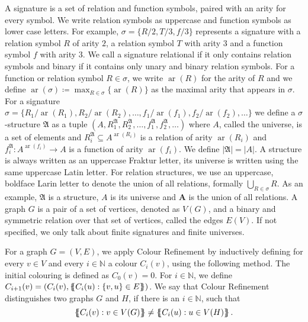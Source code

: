 A signature is a set of relation and function symbols, paired with an arity for every symbol.
We write relation symbols as uppercase and function symbols as lower case letters.
For example, $\sigma=\{R/2, T/3, f/3\}$ represents a signature with a relation symbol $R$ of arity $2$, a relation symbol $T$ with arity $3$ and a function symbol $f$ with arity $3$.
We call a signature relational if it only contains relation symbols and binary if it contains only unary and binary relation symbols.
For a function or relation symbol $R\in \sigma$, we write $\operatorname{ar}(R)$ for the arity of $R$ and we define $\operatorname{ar}(\sigma)\coloneqq \max_{R\in\sigma}\{\operatorname{ar}(R)\}$ as the maximal arity that appears in $\sigma$.
For a signature $\sigma=\{R_1/\operatorname{ar}(R_1), R_2/\operatorname{ar}(R_2), \dots, f_1/\operatorname{ar}(f_1),f_2/\operatorname{ar}(f_2),\dots\}$ we define a $\sigma$-structure $\mathfrak A$ as a tuple $(A,R_1^{\mathfrak A},R_2^{\mathfrak A},\dots,f_1^{\mathfrak A},f_2^{\mathfrak A},\dots)$ where $A$, called the universe, is a set of elements and $R_i^{\mathfrak A}\subseteq A^{\operatorname{ar}(R_i)}$ is a relation of arity $\operatorname{ar}(R_i)$ and $f_i^{\mathfrak A}:A^{\operatorname{ar}(f_i)}\to A$ is a function of arity $\operatorname{ar}(f_i)$.
We define $\vert \mathfrak A\vert =\vert A \vert$.
A structure is always written as an uppercase Fraktur letter, its universe is written using the same uppercase Latin letter.
For relation structures, we use an uppercase, boldface Larin letter to denote the union of all relations, formally $\bigcup_{R\in\sigma}R$.
As an example, $\mathfrak A$ is a structure, $A$ is its universe and $\mathbf A$ is the union of all relations.
A graph $G$ is a pair of a set of vertices, denoted as $V(G)$, and a binary and symmetric relation over that set of vertices, called the edges $E(V)$.
If not specified, we only talk about finite signatures and finite universes.

For a graph $G=(V,E)$, we apply Colour Refinement by inductively defining for every $v\in V$ and every $i\in \mathbb N$ a colour $C_i(v)$, using the following method.
The initial colouring is defined as $C_0(v)=0$.
For $i\in \mathbb N$, we define $C_{i+1}(v)=(C_i(v), \left\{\kern-.35em\left\{C_i(u) : \{v,u\}\in E\right\}\kern-.35em\right\})$.
We say that Colour Refinement distinguishes two graphs $G$ and $H$, if there is an $i\in \mathbb N$, such that 
$$\left\{\kern-.35em\left\{C_i(v) : v\in V(G)\right\}\kern-.35em\right\}\neq \left\{\kern-.35em\left\{C_i(u) : u \in V(H)\right\}\kern-.35em\right\}.$$

